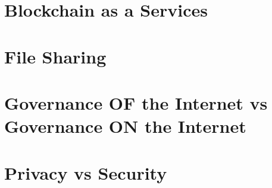 \documentclass{article}
\begin{document}
\section{Blockchain as a Services}
    
    
\section{File Sharing}
    
   
    
    
    
\section{Governance OF the Internet vs Governance ON the Internet}
    
    
\section{Privacy vs Security}
   
    

  

\end{document}
